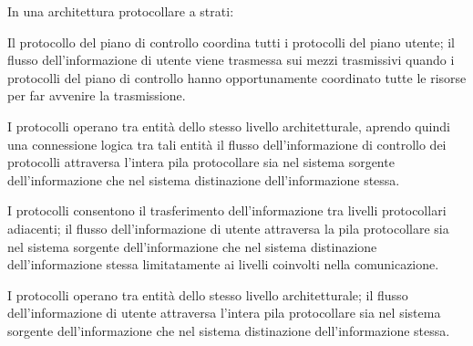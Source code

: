 \question[1]
In una architettura protocollare a strati:

\begin{checkboxes}
	\choice Il protocollo del piano di controllo coordina tutti i protocolli del piano utente; %
	il flusso dell'informazione di utente viene trasmessa sui mezzi trasmissivi quando i protocolli del piano di controllo hanno opportunamente coordinato tutte le risorse per far avvenire la trasmissione.

	\choice I protocolli operano tra entità dello stesso livello architetturale, aprendo quindi una connessione logica tra tali entità il flusso dell'informazione di controllo dei protocolli attraversa l'intera pila protocollare sia nel sistema sorgente dell'informazione che nel sistema distinazione dell'informazione stessa.

	\choice I protocolli consentono il trasferimento dell'informazione tra livelli protocollari adiacenti; %
	il flusso dell'informazione di utente attraversa la pila protocollare sia nel sistema sorgente dell'informazione che nel sistema distinazione dell'informazione stessa limitatamente ai livelli coinvolti nella comunicazione.

	\CorrectChoice I protocolli operano tra entità dello stesso livello architetturale; %
	il flusso dell'informazione di utente attraversa l'intera pila protocollare sia nel sistema sorgente dell'informazione che nel sistema distinazione dell'informazione stessa.
\end{checkboxes}
